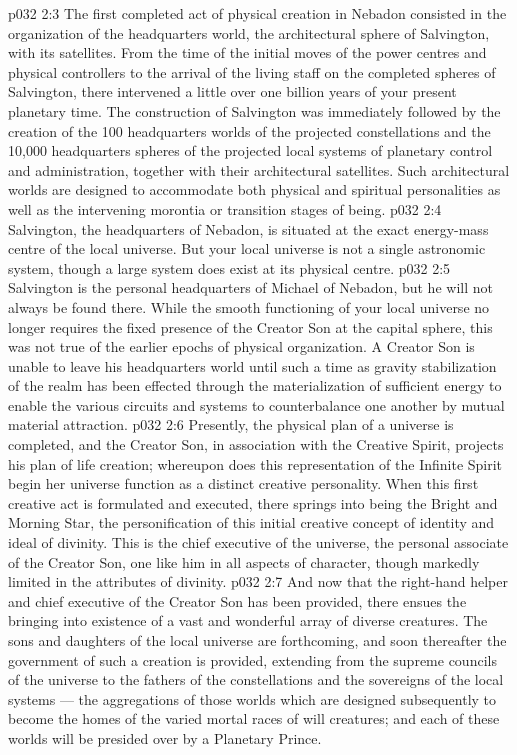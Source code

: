 \vs p032 2:3 \pc The first completed act of physical creation in Nebadon consisted in the organization of the headquarters world, the architectural sphere of Salvington, with its satellites. From the time of the initial moves of the power centres and physical controllers to the arrival of the living staff on the completed spheres of Salvington, there intervened a little over one billion years of your present planetary time. The construction of Salvington was immediately followed by the creation of the 100 headquarters worlds of the projected constellations and the 10,000 headquarters spheres of the projected local systems of planetary control and administration, together with their architectural satellites. Such architectural worlds are designed to accommodate both physical and spiritual personalities as well as the intervening morontia or transition stages of being.
\vs p032 2:4 Salvington, the headquarters of Nebadon, is situated at the exact energy\hyp{}mass centre of the local universe. But your local universe is not a single astronomic system, though a large system does exist at its physical centre.
\vs p032 2:5 Salvington is the personal headquarters of Michael of Nebadon, but he will not always be found there. While the smooth functioning of your local universe no longer requires the fixed presence of the Creator Son at the capital sphere, this was not true of the earlier epochs of physical organization. A Creator Son is unable to leave his headquarters world until such a time as gravity stabilization of the realm has been effected through the materialization of sufficient energy to enable the various circuits and systems to counterbalance one another by mutual material attraction.
\vs p032 2:6 \pc Presently, the physical plan of a universe is completed, and the Creator Son, in association with the Creative Spirit, projects his plan of life creation; whereupon does this representation of the Infinite Spirit begin her universe function as a distinct creative personality. When this first creative act is formulated and executed, there springs into being the Bright and Morning Star, the personification of this initial creative concept of identity and ideal of divinity. This is the chief executive of the universe, the personal associate of the Creator Son, one like him in all aspects of character, though markedly limited in the attributes of divinity.
\vs p032 2:7 And now that the right\hyp{}hand helper and chief executive of the Creator Son has been provided, there ensues the bringing into existence of a vast and wonderful array of diverse creatures. The sons and daughters of the local universe are forthcoming, and soon thereafter the government of such a creation is provided, extending from the supreme councils of the universe to the fathers of the constellations and the sovereigns of the local systems --- the aggregations of those worlds which are designed subsequently to become the homes of the varied mortal races of will creatures; and each of these worlds will be presided over by a Planetary Prince.
